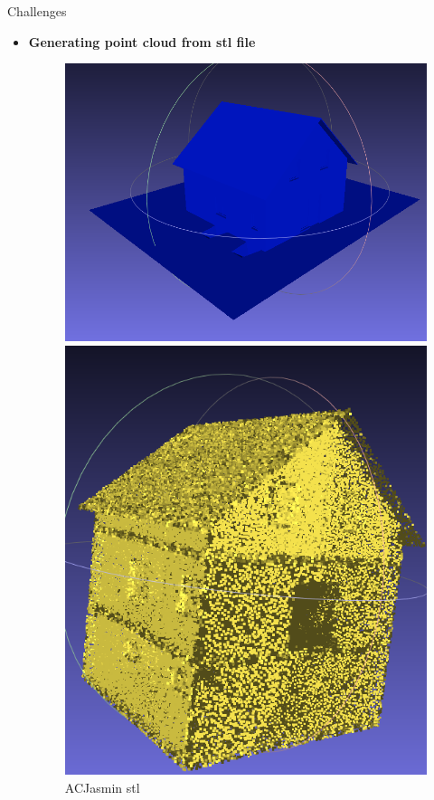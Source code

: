 \documentclass[10pt]{beamer}
\begin{document}
\begin{frame}{Challenges}
\begin{itemize}    
    \item \textbf{Generating point cloud from stl file}
\begin{figure}[H]
        \begin{minipage}[t]{0.25\textwidth}
            \includegraphics[width=\textwidth]{../../images/screen_kinetic/ACJasmin.png}
            \caption*{ACJasmin stl}
        \end{minipage}
        \begin{minipage}[t]{0.20\textwidth}
          \includegraphics[width=\textwidth]{../../images/screen_kinetic/ACJasmin_point_cloud.png}

\end{minipage}
\end{figure}
\end{itemize}
\end{frame}
\end{document}
